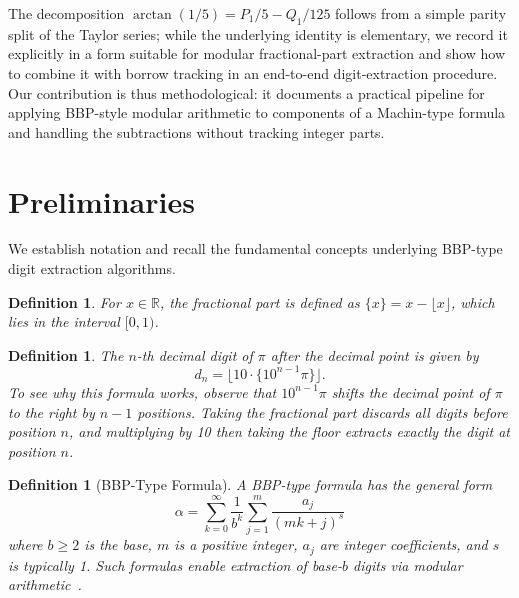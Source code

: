 \documentclass[11pt]{article}
\newtheorem{definition}[theorem]{Definition}
\begin{document}
The decomposition $\arctan(1/5) = P_1/5 - Q_1/125$ follows from a simple parity split of the Taylor series; while the underlying identity is elementary, we record it explicitly in a form suitable for modular fractional-part extraction and show how to combine it with borrow tracking in an end-to-end digit-extraction procedure. Our contribution is thus methodological: it documents a practical pipeline for applying BBP-style modular arithmetic to components of a Machin-type formula and handling the subtractions without tracking integer parts.

\section{Preliminaries}

We establish notation and recall the fundamental concepts underlying BBP-type digit extraction algorithms.

\begin{definition}\label{def:frac}
For $x \in \mathbb{R}$, the fractional part is defined as $\{x\} = x - \lfloor x \rfloor$, which lies in the interval $[0,1)$.
\end{definition}

\begin{definition}\label{def:digit}
The $n$-th decimal digit of $\pi$ after the decimal point is given by
\[
d_n = \lfloor 10 \cdot \{10^{n-1}\pi\} \rfloor.
\]
To see why this formula works, observe that $10^{n-1}\pi$ shifts the decimal point of $\pi$ to the right by $n-1$ positions. Taking the fractional part discards all digits before position $n$, and multiplying by 10 then taking the floor extracts exactly the digit at position $n$.
\end{definition}

\begin{definition}[BBP-Type Formula]\label{def:bbp}
A BBP-type formula has the general form
\[
\alpha = \sum_{k=0}^{\infty} \frac{1}{b^k} \sum_{j=1}^{m} \frac{a_j}{(mk+j)^s}
\]
where $b \geq 2$ is the base, $m$ is a positive integer, $a_j$ are integer coefficients, and $s$ is typically 1. Such formulas enable extraction of base-$b$ digits via modular arithmetic~\cite{bailey2000}.
\end{definition}
\end{document}
